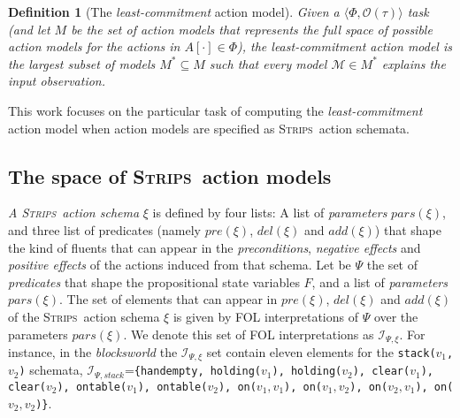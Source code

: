 \documentclass{article}
\newcommand{\tup}[1]{{\langle #1 \rangle}}
\newcommand{\strips}{\textsc{Strips}}
\newtheorem{definition}[theorem]{Definition}
\begin{document}
\begin{definition}[The {\em least-commitment} action model]
Given a $\tup{\Phi,\mathcal{O}(\tau)}$ task (and let $M$ be the set of action models that represents the full space of possible action models for the actions in $A[\cdot]\in \Phi$), the {\em least-commitment} action model is the largest subset of models $M^*\subseteq M$ such that every model $\mathcal{M}\in M^*$ {\em explains} the input observation.
\end{definition}

This work focuses on the particular task of computing the {\em least-commitment} action model when action models are specified as \strips\ action schemata. 

\subsection{The space of \strips\ action models}
{\em A \strips\ action schema} $\xi$ is defined by four lists: A list of {\em parameters} $pars(\xi)$, and three list of predicates (namely $pre(\xi)$, $del(\xi)$ and $add(\xi)$) that shape the kind of fluents that can appear in the {\em preconditions}, {\em negative effects} and {\em positive effects} of the actions induced from that schema. Let be $\Psi$ the set of {\em predicates} that shape the propositional state variables $F$, and a list of {\em parameters} $pars(\xi)$. The set of elements that can appear in $pre(\xi)$, $del(\xi)$ and $add(\xi)$ of the \strips\ action schema $\xi$ is given by FOL interpretations of $\Psi$ over the parameters $pars(\xi)$. We denote this set of FOL interpretations as ${\mathcal I}_{\Psi,\xi}$. For instance, in the {\em blocksworld} the ${\mathcal I}_{\Psi,\xi}$ set contain eleven elements for the {\small \tt stack($v_1$,$v_2$)} schemata, ${\mathcal I}_{\Psi,stack}$={\small\tt\{handempty, holding($v_1$), holding($v_2$), clear($v_1$), clear($v_2$), ontable($v_1$), ontable($v_2$), on($v_1,v_1$), on($v_1,v_2$), on($v_2,v_1$), on($v_2,v_2$)\}}. 
\end{document}
